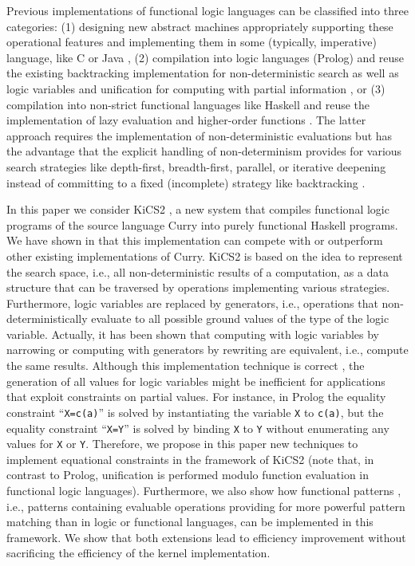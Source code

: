 \documentclass{llncs}
\newcommand{\code}[1]{\mbox{\small\texttt{#1}}}
\newcommand{\ccode}[1]{``\code{#1}''}
\begin{document}
Previous implementations of functional logic languages
can be classified into three categories:
(1) designing new abstract machines appropriately supporting
these operational features and implementing them in some (typically,
imperative) language, like C \cite{Lux99FLOPS}
or Java \cite{AntoyHanusLiuTolmach05,HanusSadre99JFLP},
(2) compilation into logic languages (Prolog) and reuse
the existing backtracking implementation for non-deterministic
search as well as logic variables and unification for computing with partial
information \cite{AntoyHanus00FROCOS,Lopez-FraguasSanchez-Hernandez99}, or
(3) compilation into non-strict functional languages like Haskell
and reuse the implementation
of lazy evaluation and higher-order functions
\cite{BrasselHuch07,BrasselHuch09}.
The latter approach requires the implementation
of non-deterministic evaluations but has the advantage
that the explicit handling of non-determinism provides for
various search strategies like depth-first, breadth-first, parallel,
or iterative deepening instead of committing to a fixed (incomplete)
strategy like backtracking \cite{BrasselHuch07}.

In this paper we consider KiCS2 \cite{BrasselFischerHanusReck11},
a new system that compiles functional logic programs of the
source language Curry \cite{Hanus06Curry}
into purely functional Haskell programs.
We have shown in \cite{BrasselFischerHanusReck11}
that this implementation can compete with or outperform
other existing implementations of Curry.
KiCS2 is based on the idea to represent
the search space, i.e., all non-deterministic results of a computation,
as a data structure that can be traversed by operations
implementing various strategies.
Furthermore, logic variables are replaced by generators,
i.e., operations that non-deterministically evaluate to
all possible ground values of the type of the logic variable.
Actually, it has been shown \cite{AntoyHanus06ICLP}
that computing with logic variables by narrowing \cite{Reddy85,Slagle74}
or computing with generators by rewriting
are equivalent, i.e., compute the same results.
Although this implementation technique is correct \cite{Brassel11Thesis},
the generation of all values for logic variables
might be inefficient for applications that
exploit constraints on partial values.
For instance, in Prolog the equality constraint \ccode{X=c(a)}
is solved by instantiating the variable \code{X} to \code{c(a)},
but the equality constraint \ccode{X=Y} is solved by binding \code{X}
to \code{Y} without enumerating any values for \code{X} or \code{Y}.
Therefore, we propose in this paper new techniques
to implement equational constraints in the framework of KiCS2
(note that, in contrast to Prolog, unification is performed
modulo function evaluation in functional logic languages).
Furthermore, we also show how functional patterns \cite{AntoyHanus05LOPSTR},
i.e., patterns containing evaluable operations providing
for more powerful pattern matching than in logic or functional languages,
can be implemented in this framework.
We show that both extensions lead to efficiency improvement
without sacrificing the efficiency of the kernel implementation.
\end{document}
